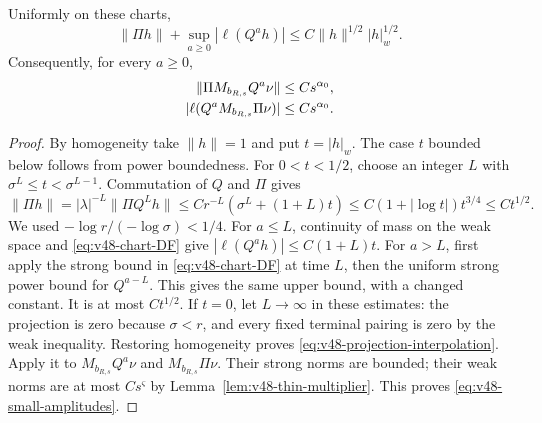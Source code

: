 \begin{lemma}
\label{lem:v48-weak-interpolation}
Uniformly on these charts,
\begin{equation}\label{eq:v48-projection-interpolation}
 \|\Pi h\|+\sup_{a\ge0}|\ell(Q^a h)|
               \le C\|h\|^{1/2}|h|_w^{1/2}.
\end{equation}
Consequently, for every $a\ge0$,
\begin{align}
 \|\Pi M_{b_{R,s}}Q^a\nu\|&\le Cs^{\alpha_0},\notag\\
 |\ell(Q^aM_{b_{R,s}}\Pi\nu)|&\le Cs^{\alpha_0}.
                                      \label{eq:v48-small-amplitudes}
\end{align}
\end{lemma}
\begin{proof}
By homogeneity take $\|h\|=1$ and put $t=|h|_w$.
The case $t$ bounded below follows from power boundedness. For
$0<t<1/2$, choose an integer $L$ with $\sigma^L\le t<\sigma^{L-1}$.
Commutation of $Q$ and $\Pi$ gives
\[
 \|\Pi h\|=|\lambda|^{-L}\|\Pi Q^Lh\|
       \le C r^{-L}(\sigma^L+(1+L)t)
       \le C(1+|\log t|)t^{3/4}\le Ct^{1/2}.
\]
We used $-\log r/(-\log\sigma)<1/4$. For $a\le L$, continuity of
mass on the weak space and \eqref{eq:v48-chart-DF} give
$|\ell(Q^a h)|\le C(1+L)t$. For $a>L$, first apply the strong
bound in \eqref{eq:v48-chart-DF} at time $L$, then the uniform strong
power bound for $Q^{a-L}$. This gives the same upper bound, with a
changed constant. It is at most $Ct^{1/2}$.
If $t=0$, let $L\to\infty$ in these estimates: the projection is
zero because $\sigma<r$, and every fixed terminal pairing is zero by
the weak inequality. Restoring homogeneity proves
\eqref{eq:v48-projection-interpolation}.
Apply it to $M_{b_{R,s}}Q^a\nu$ and $M_{b_{R,s}}\Pi\nu$.
Their strong norms are bounded; their weak norms are at most
$Cs^{\varsigma}$ by Lemma~\ref{lem:v48-thin-multiplier}.
This proves \eqref{eq:v48-small-amplitudes}.
\end{proof}

